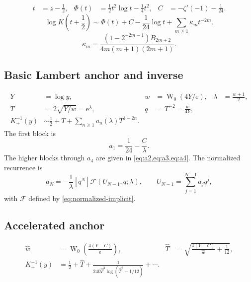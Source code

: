 \documentclass[11pt,oneside]{article}
\theoremstyle{plain}
\theoremstyle{definition}
\theoremstyle{remark}
\newcommand{\W}{\operatorname{W}}
\newcommand{\e}{\mathrm{e}}
\newcommand{\Fcal}{\mathcal{F}}
\begin{document}
\begin{align}
 t&=z-\frac12,
 &\Phi(t)&=\frac12t^2\log t-\frac14t^2,
 &C&=-\zeta'(-1)-\frac1{24}.
 \label{eq:sheet-forward-1}
\end{align}
\begin{equation}
 \log K\!\left(t+\frac12\right)
 \sim \Phi(t)+C-\frac1{24}\log t+
 \sum_{m\ge1}\kappa_m t^{-2m}.
 \label{eq:sheet-forward-2}
\end{equation}
\begin{equation}
 \kappa_m
 =\frac{(1-2^{-2m-1})B_{2m+2}}
 {4m(m+1)(2m+1)}.
 \label{eq:sheet-kappa}
\end{equation}

\subsection{Basic Lambert anchor and inverse}

\begin{align}
 Y&=\log y,
 &w&=\W_0(4Y/\e),
 &\lambda&=\frac{w+1}{2},
 \label{eq:sheet-anchor-1}\\
 T&=2\sqrt{Y/w}=\e^\lambda,
 &q&=T^{-2}=\frac{w}{4Y},
 &&
 \label{eq:sheet-anchor-2}\\
 K_+^{-1}(y)
 &\sim\frac12+T+\sum_{n\ge1}a_n(\lambda)T^{1-2n}.
 &&
 \label{eq:sheet-inverse}
\end{align}
The first block is
\begin{equation}
 a_1=\frac1{24}-\frac C\lambda.
 \label{eq:sheet-a1}
\end{equation}
The higher blocks through \(a_4\) are given in
\cref{eq:a2,eq:a3,eq:a4}.  The normalized recurrence is
\begin{equation}
 a_N=-\frac1\lambda[q^N]\Fcal(U_{N-1},q;\lambda),
 \qquad
 U_{N-1}=\sum_{j=1}^{N-1}a_jq^j,
 \label{eq:sheet-recurrence}
\end{equation}
with \(\Fcal\) defined by \cref{eq:normalized-implicit}.

\subsection{Accelerated anchor}

\begin{align}
 \widehat w&=\W_0\!\left(\frac{4(Y-C)}{\e}\right),
 &\widehat T&=
 \sqrt{\frac{4(Y-C)}{\widehat w}+\frac1{12}},
 \label{eq:sheet-accelerated-1}\\
 K_+^{-1}(y)
 &=\frac12+\widehat T
 +\frac{1}{240\widehat T^3
 \log(\widehat T^2-1/12)}+\cdots.
 \label{eq:sheet-accelerated-2}
\end{align}
\end{document}
